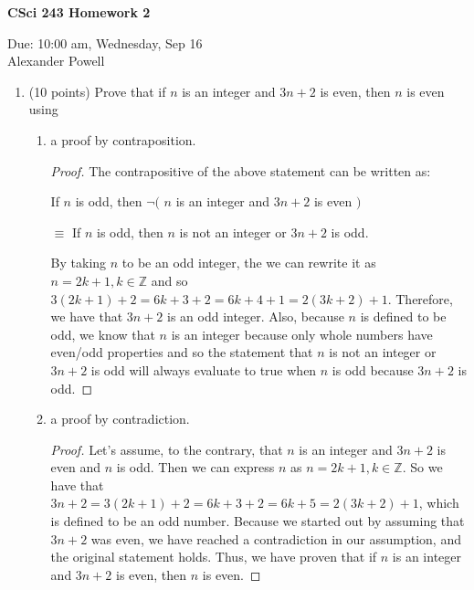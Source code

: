 \documentclass[11pt]{article}
\begin{document}
\begin{center}             %
\begin{LARGE}
{\bf CSci 243 Homework 2}
\end{LARGE}
\vskip 0.25cm      %

Due: 10:00 am, Wednesday, Sep 16\\  %
Alexander Powell
\end{center}

\begin{enumerate}

\item (10 points) Prove that if $n$ is an integer 
and $3n+2$ is even, then $n$ is even using
\begin{enumerate}
\item a proof by contraposition.

\begin{proof}

The contrapositive of the above statement can be written as:

If $n$ is odd, then $\lnot($ $n$ is an integer and $3n+2$ is even $)$

$\equiv$ If $n$ is odd, then $n$ is not an integer or $3n+2$ is odd.  

By taking $n$ to be an odd integer, the we can rewrite it as $n = 2k+1, k \in \mathbb{Z}$ and so $3(2k+1)+2 = 6k+3+2 = 6k+4+1 = 2(3k+2) + 1$.  Therefore, we have that $3n+2$ is an odd integer.  Also, because $n$ is defined to be odd, we know that $n$ is an integer because only whole numbers have even/odd properties and so the statement that $n$ is not an integer or $3n+2$ is odd will always evaluate to true when $n$ is odd because $3n+2$ is odd.  
\end{proof}

\item a proof by contradiction.

\begin{proof}

Let's assume, to the contrary, that $n$ is an integer and $3n+2$ is even and $n$ is odd.  Then we can express $n$ as $n = 2k+1, k \in \mathbb{Z}$.  So we have that $3n+2 = 3(2k+1)+2 = 6k+3+2 = 6k+5 = 2(3k+2) +1$, which is defined to be an odd number.  Because we started out by assuming that $3n+2$ was even, we have reached a contradiction in our assumption, and the original statement holds.  Thus, we have proven that if $n$ is an integer and $3n+2$ is even, then $n$ is even.  


\end{proof}
\end{enumerate}
\end{enumerate}
\end{document}
